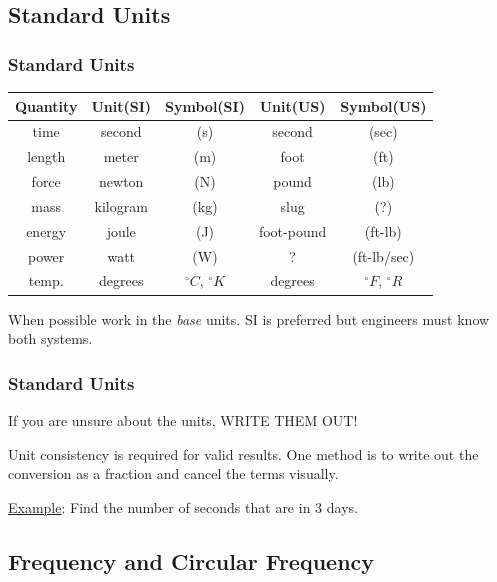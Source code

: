 \documentclass[fleqn]{beamer} %
\newcommand{\sectionIIsubsectionItitle}{Standard Units}
\newcommand{\sectionIIsubsectionIIItitle}{Frequency and Circular Frequency}
\begin{document}
		\subsection{\sectionIIsubsectionItitle}\label{sectionIIsubsectionI}

			\begin{frame}[label=sectionIIsubsectionI]
				\frametitle{\sectionIIsubsectionItitle}
				\bigskip
				
				\renewcommand{\arraystretch}{1.2}
				\begin{tabular}{|c|c|c|c|c|} \hline
				\textbf{Quantity}&\textbf{Unit(SI)} &\textbf{ Symbol(SI)}&\textbf{Unit(US)}&\textbf{Symbol(US)}\\ \hline
				time&second&(s)&second&(sec)\\ \hline
				length&meter&(m)&foot&(ft)\\ \hline
				force&newton&(N)&pound&(lb)\\ \hline
				mass&kilogram&(kg)&slug&(?) \\\hline
				energy&joule&(J)&foot-pound&(ft-lb)\\ \hline
				power&watt&(W)&?&(ft-lb/sec)\\ \hline
				temp.&degrees&$^\circ C$, $^\circ K$&degrees&$^\circ F$, $^\circ R$ \\ \hline
				\end{tabular}

				\vspace{3mm}When possible work in the {\it base} units. SI is preferred but engineers must know both systems.

				\btVFill
			\end{frame}

		    \begin{frame}[label=sectionIIsubsectionI]
				\frametitle{\sectionIIsubsectionItitle}
				\bigskip
				
				If you are unsure about the units, WRITE THEM OUT!

				Unit consistency is required for valid results. One method is to write out the conversion as a fraction and cancel the terms visually.\vspc

				\underline{Example}: Find the number of seconds that are in 3 days. \vspcc


				\btVFill
			\end{frame}	

		\subsection{\sectionIIsubsectionIIItitle}\label{sectionIIsubsectionIII}
\end{document}
